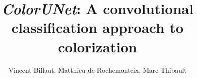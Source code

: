 \documentclass[final]{beamer}
\title{\textit{ColorUNet}: A convolutional classification approach to colorization} %
\author{Vincent Billaut, Matthieu de Rochemonteix, Marc Thibault} %
\institute{CS231n Final Project, 03/12/2018} %
\newlength{\sepwid}
\newlength{\onecolwid}
\begin{document}

\setlength{\belowcaptionskip}{2ex} %
\setlength\belowdisplayshortskip{2ex} %

\begin{frame}[t] %

\begin{columns}[t] %

\begin{column}{\sepwid}\end{column} %

\begin{column}{\onecolwid} %







\end{column}
\end{columns}
\end{frame}
\end{document}
